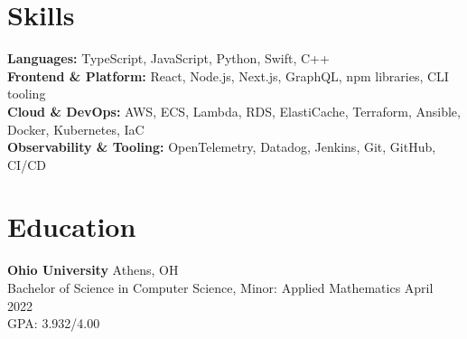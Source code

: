 \documentclass[11pt,a4paper]{article}
\newcommand{\sectionspace}{\vspace{0.8mm}}
\begin{document}
\section{Skills}
\sectionspace
\textbf{Languages:} TypeScript, JavaScript, Python, Swift, C++\\
\textbf{Frontend \& Platform:} React, Node.js, Next.js, GraphQL, npm libraries, CLI tooling\\
\textbf{Cloud \& DevOps:} AWS, ECS, Lambda, RDS, ElastiCache, Terraform, Ansible, Docker, Kubernetes, IaC\\
\textbf{Observability \& Tooling:} OpenTelemetry, Datadog, Jenkins, Git, GitHub, CI/CD

\section{Education}
\sectionspace
\textbf{Ohio University} \hfill Athens, OH\\
Bachelor of Science in Computer Science, Minor: Applied Mathematics \hfill April 2022\\
GPA: 3.932/4.00
\end{document}
